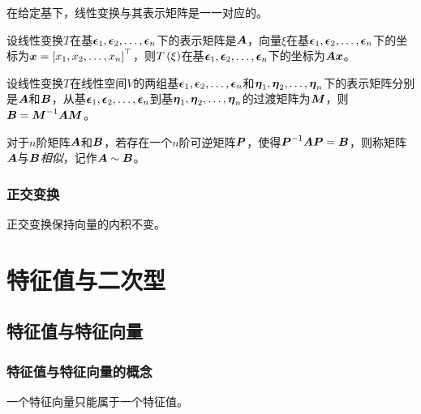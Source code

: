 \documentclass{ctexart}
\begin{document}
\begin{theorem}
    在给定基下，线性变换与其表示矩阵是一一对应的。
\end{theorem}

\begin{theorem}
    设线性变换\(T\)在基\(\enums{\veceps}{n}\)下的表示矩阵是\(\mata\)，向量\(\xi\)在基\(\enums{\veceps}{n}\)下的坐标为\(\vecx=\mat{\enums{x}{n}}^\top\)，则\(T\mypar{\xi}\)在基\(\enums{\veceps}{n}\)下的坐标为\(\mata\vecx\)。
\end{theorem}

\begin{theorem}
    设线性变换\(T\)在线性空间\(V\)的两组基\(\enums{\veceps}{n}\)和\(\enums{\veceta}{n}\)下的表示矩阵分别是\(\mata\)和\(\matb\)，从基\(\enums{\veceps}{n}\)到基\(\enums{\veceta}{n}\)的过渡矩阵为\(\matm\)，则\(\matb=\inv{\matm}\mata\matm\)。
\end{theorem}

\begin{definition}[相似]
    对于\(n\)阶矩阵\(\mata\)和\(\matb\)，若存在一个\(n\)阶可逆矩阵\(\matp\)，使得\(\inv{\matp}\mata\matp=\matb\)，则称矩阵\(\mata\)与\(\matb\)\emph{相似}，记作\(\mata\sim\matb\)。
\end{definition}

\subsubsection*{正交变换}

\begin{theorem}
    正交变换保持向量的内积不变。
\end{theorem}

\section{特征值与二次型}

\subsection{特征值与特征向量}

\subsubsection*{特征值与特征向量的概念}

\begin{theorem}
    一个特征向量只能属于一个特征值。
\end{theorem}
\end{document}
